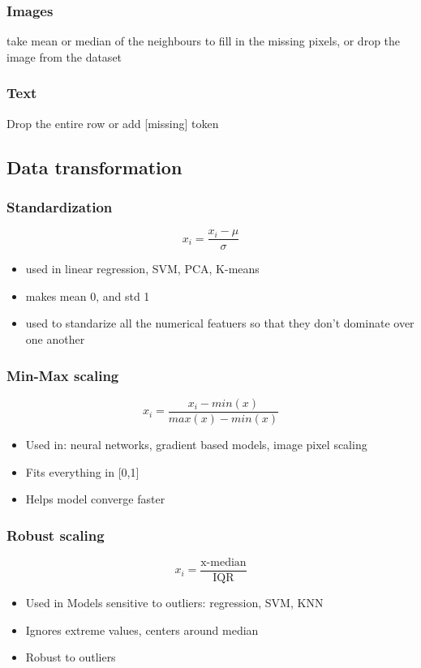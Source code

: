 \documentclass[12pt]{extarticle}
\begin{document}
\subsubsection{Images}
take mean or median of the neighbours to fill in the missing pixels, 
or drop the image from the dataset
\subsubsection{Text}
Drop the entire row or add [missing] token

\subsection{Data transformation}
\subsubsection{Standardization}
$$ x_i = \frac{x_i - \mu }{\sigma} $$
\begin{itemize}
    \item used in linear regression, SVM, PCA, K-means
    \item makes mean 0, and std 1
    \item used to standarize all the numerical featuers so 
        that they don't dominate over one another
\end{itemize}

\subsubsection{Min-Max scaling}
$$ x_i = \frac{x_i - min(x)}{max(x)-min(x)} $$
\begin{itemize}
    \item Used in: neural networks, gradient based models, image pixel scaling
    \item Fits everything in [0,1]
    \item Helps model converge faster
\end{itemize}

\subsubsection{Robust scaling}
$$ x_i = \frac{\text{x-median}}{\text{IQR}} $$
\begin{itemize}
    \item Used in Models sensitive to outliers: regression, SVM, KNN
    \item Ignores extreme values, centers around median
    \item Robust to outliers
\end{itemize}
\end{document}
